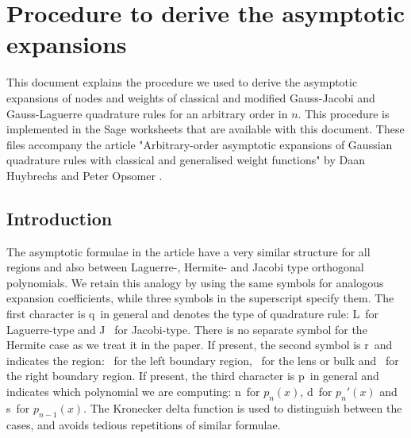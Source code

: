\documentclass[11pt]{article}
\newcommand*{\Pc}[1]{{\color{blue}#1}}
\newcommand{\qg}{q}
\newcommand{\ql}{L}
\newcommand{\qj}{J}
\newcommand{\rg}{r}
\newcommand{\rb}{{\scriptsize \Romanbar{1}} }
\newcommand{\rr}{{\scriptsize \Romanbar{3}} }
\newcommand{\rl}{{\scriptsize \Romanbar{4}} }
\newcommand{\pg}{p}
\newcommand{\pn}{n}
\newcommand{\pd}{d}
\newcommand{\ps}{s}
\numberwithin{equation}{section}
\begin{document}





\section{Procedure to derive the asymptotic expansions} \label{SsageWorksheets}
This document explains the procedure we used to derive the asymptotic expansions of nodes and weights of classical and modified Gauss-Jacobi and Gauss-Laguerre quadrature rules for an arbitrary order in $n$. This procedure is implemented in the Sage worksheets that are available with this document. These files accompany the article "Arbitrary-order asymptotic expansions of {G}aussian quadrature rules with classical and generalised weight functions" by Daan Huybrechs and Peter Opsomer \cite{quadr}.%

\subsection{Introduction}

The asymptotic formulae in the article %
have a very similar structure for all regions and also between Laguerre-, Hermite- and Jacobi type orthogonal polynomials. We retain this analogy by using the same symbols for analogous expansion coefficients, while three symbols in the superscript specify them. The first character is \qg~in general and denotes the type of quadrature rule: \ql~for Laguerre-type and \qj~ for Jacobi-type. There is no separate symbol for the Hermite case as we treat it in the paper. %
If present, the second symbol is \rg~and indicates the region: \rl~for the left boundary region, \rb~for the lens or bulk and \rr~for the right boundary region. If present, the third character is \pg~in general and indicates which polynomial we are computing: \pn~for $p_n(x)$, \pd~for $p_n'(x)$ and \ps~for $p_{n-1}(x)$. The Kronecker delta function is used to distinguish between the cases, and avoids tedious repetitions of similar formulae. %
\end{document}
